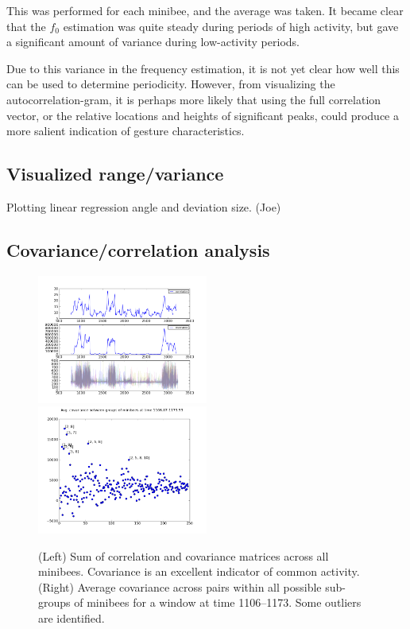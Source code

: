 \documentclass{article}
\begin{document}
This was performed for each minibee, and the average was taken.  It
became clear that the $f_0$ estimation was quite steady during periods
of high activity, but gave a significant amount of variance during
low-activity periods.

Due to this variance in the frequency estimation, it is not yet clear
how well this can be used to determine periodicity.  However, from
visualizing the autocorrelation-gram, it is perhaps more likely that
using the full correlation vector, or the relative locations and
heights of significant peaks, could produce a more salient indication
of gesture characteristics.

\subsection{Visualized range/variance}

Plotting linear regression angle and deviation size. (Joe)

\subsection{Covariance/correlation analysis}

\begin{figure}
\includegraphics[width=0.5\textwidth]{images/corr_cov.png}
\includegraphics[width=0.5\textwidth]{images/cov_groups_1106.png}
\caption{(Left) Sum of correlation and covariance matrices across all
  minibees.  Covariance is an excellent indicator of common activity.
  (Right) Average covariance across pairs within all possible
  sub-groups of minibees for a window at time 1106--1173.  Some
  outliers are identified.}
\label{covgroups}
\end{figure}
\end{document}
